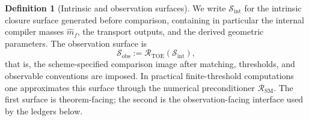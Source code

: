 \documentclass[11pt,a4paper]{article}
\theoremstyle{definition}
\newtheorem{definition}[theorem]{Definition}
\theoremstyle{remark}
\newcommand{\SM}{\mathrm{SM}}
\begin{document}
\begin{definition}[Intrinsic and observation surfaces]
\label{def:intrinsic-observation-surfaces}
We write $\mathcal S_{\mathrm{int}}$ for the intrinsic closure surface generated before
comparison, containing in particular the internal compiler masses $\hat m_f$, the transport
outputs, and the derived geometric parameters. The observation surface is
\[
\mathcal S_{\mathrm{obs}}:=\mathcal R_{\mathrm{TOE}}(\mathcal S_{\mathrm{int}}),
\]
that is, the scheme-specified comparison image after matching, thresholds, and observable
conventions are imposed. In practical finite-threshold computations one approximates this surface
through the numerical preconditioner $\mathcal R_{\SM}$. The first surface is theorem-facing; the
second is the observation-facing interface used by the ledgers below.
\end{definition}
\end{document}

